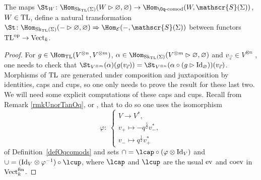 \begin{Proposition}\label{propStNat}
The maps $\St_W \colon \Hom_{{\rm Sk}_{{\rm TL}}(\Sigma)}(W\rhd \varnothing,\varnothing) \to \Hom_{\Oq\text{-}{\rm comod}}(W, \mathscr{S}(\Sigma))$, $W \in {\rm TL}$, define a natural transformation $\St\colon \Hom_{{\rm Sk}_{{\rm TL}}(\Sigma)}(-\rhd \varnothing,\varnothing) \Rightarrow \Hom_{\mathcal{E}}(-, \mathscr{S}(\Sigma))$ between functors ${\rm TL}^{\rm op}\to {\rm Vect}_k$.
\end{Proposition}
\begin{proof}
For $g \in \Hom_{{\rm TL}}(V^{\otimes n},V^{\otimes m})$, $\alpha \in \Hom_{{\rm Sk}_{{\rm TL}}(\Sigma)}(V^{\otimes m}\rhd \varnothing,\varnothing)$ and $v_{\vec{\varepsilon}} \in V^{\otimes n}$
, one needs to check that $\St_{V^{\otimes m}}(\alpha)(g(v_{\vec{\varepsilon}})) = \St_{V^{\otimes n}}(\alpha \circ (g\rhd {\rm Id}_\varnothing))(v_{\vec{\varepsilon}})$. Morphisms of ${\rm TL}$ are generated under composition and juxtaposition by identities, caps and cups, so one only needs to prove the result for these last two.
We will need some explicit computations of these caps and cups. Recall from Remark \ref{rmkUnorTanOq}, or \cite[Theorem~4.2]{Tingley}, that to do so one uses the isomorphism
\[
\varphi \colon\ \begin{cases}
V \to V^*,
\\
v_+ \mapsto -q^{\frac{5}{2}} v_-^*,
\\ v_- \mapsto q^{\frac{1}{2}}v_+^*\end{cases}
\]
 of Definition~\ref{defOqcomods} and sets $\cap = \lcap \circ (\varphi \otimes {\rm Id}_V)$ and $\cup = ({\rm Id}_V \otimes \varphi^{-1})\circ \lcup$, where $\lcap$ and $\lcup$ are the usual ${\rm ev}$ and ${\rm coev}$ in ${\rm Vect}_k^{\rm fin}$.


\end{proof}
